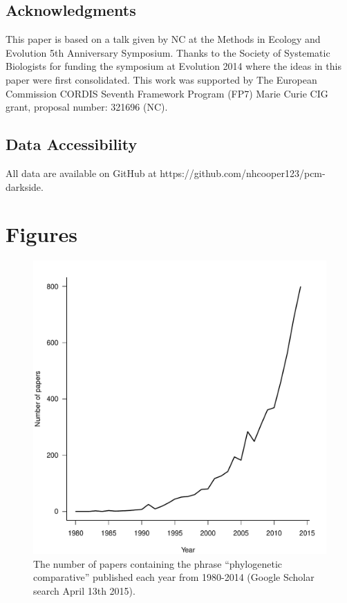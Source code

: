 \documentclass[a4paper,12pt]{article}
\begin{document}
  \subsection{Acknowledgments}
    This paper is based on a talk given by NC at the Methods in Ecology and Evolution 5th Anniversary Symposium.
    Thanks to the Society of Systematic Biologists for funding the symposium at Evolution 2014 where the ideas in this paper were first consolidated. 
    This work was supported by The European Commission CORDIS Seventh Framework Program (FP7) Marie Curie CIG grant, proposal number: 321696 (NC).

  \subsection{Data Accessibility}
    All data are available on GitHub at https://github.com/nhcooper123/pcm-darkside.




\newpage
\section{Figures}

  \begin{figure}[!htbp]
    \centering
      \includegraphics[width=12cm]{Figures/PCMCitations.pdf}
      \caption{The number of papers containing the phrase ``phylogenetic comparative'' published each year from 1980-2014 (Google Scholar search April 13th 2015).}
      \label{PCMCitations}
  \end{figure}
\end{document}
